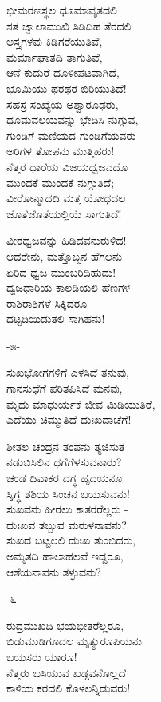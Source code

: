 ಭೀಮರಣಸ್ಥಲ ಧೂಮಾವೃತದಲಿ\\ಶತ ಜ್ವಾಲಾಮುಖಿ ಸಿಡಿದಿಹ ತೆರದಲಿ\\ಅಸ್ತ್ರಗಳವು ಕಿಡಿಗರೆಯುತಿವೆ,\\ಮರ್ಮಾಘಾತದಿ ತಾಗುತಿವೆ,\\ಆನೆ-ಕುದುರೆ ಧೂಳೀಪಟವಾಗಿದೆ,\\ಭೂಮಿಯು ಥರಥರ ಬಿರಿಯುತಿದೆ!\\ಸಹಸ್ರ ಸಂಖ್ಯೆಯ ಅಶ್ವಾರೂಢರು,\\ಧೂಮವಲಯವನ್ನು ಭೇದಿಸಿ ನುಗ್ಗುವ,\\ಗುಂಡಿಗೆ ಮಣಿಯದ ಗುಂಡಿಗೆಯವರು\\ಅರಿಗಳ ತೋಪನು ಮುತ್ತಿಹರು!\\
 ನೆತ್ತರ ಧಾರೆಯ ವಿಜಯಧ್ವಜವದೊ\\ಮುಂದಕೆ ಮುಂದಕೆ ನುಗ್ಗುತಿದೆ;\\ವೀರೋನ್ಮಾದದಿ ಮತ್ತ ಯೋಧದಲ\\ಜೊತೆಜೊತೆಯಲ್ಲಿಯೆ ಸಾಗುತಿದೆ!

ವೀರಧ್ವಜವನ್ನು ಹಿಡಿದವನುರುಳಿದ!\\ಆದರೇನು, ಮತ್ತೊಬ್ಬನ ಹೆಗಲನು\\ಏರಿದ ಧ್ವಜ ಮುಂಬರಿದಿಹುದು!\\ಧ್ವಜಧಾರಿಯ ಕಾಲಡಿಯಲಿ ಹೆಣಗಳ\\ರಾಶಿರಾಶಿಗಳೆ ಸಿಕ್ಕಿದರೂ\\ದಟ್ಟಡಿಯಿಡುತಲಿ ಸಾಗಿಹನು!

\begin{center}
-೫-
\end{center}

ಸುಖಭೋಗಗಳಿಗೆ ಎಳಸಿದೆ ತನುವು,\\ಗಾನಸುಧೆಗೆ ಪರಿತಪಿಸಿದೆ ಮನವು,\\ಮೃದು ಮಾಧುರ್ಯಕೆ ಜೀವ ಮಿಡಿಯುತಿರೆ,\\ಎದೆಯು ಚಿಮ್ಮುತಿದೆ ದುಃಖದಾಚೆಗೆ!

ಶೀತಲ ಚಂದ್ರನ ತಂಪನು ತ್ಯಜಿಸುತ\\ನಡುಬಿಸಿಲಿನ ಧಗೆಗೆಳಸುವನಾರು?\\ಚಂಡ ದಿವಾಕರ ದಗ್ಧ ಹೃದಯನೂ\\ಸ್ನಿಗ್ಧ ಶಶಿಯ ಸಿಂಚನ ಬಯಸುವನು!\\
 ಸುಖವನು ಹೀರಲು ಕಾತರರೆಲ್ಲರು -\\ದುಃಖವ ತಬ್ಬುವ ಮರುಳನಾವನು?\\ಸುಖದ ಬಟ್ಟಲಲಿ ದುಃಖ ತುಂಬಿದರು,\\ಅಮೃತದಿ ಹಾಲಾಹಲವೆ ಇದ್ದರೂ,\\ಆಶೆಯನಾವನು ತಳ್ಳುವನು?

\begin{center}
-೬-
\end{center}

ರುದ್ರಮುಖದಿ ಭಯಭೀತರೆಲ್ಲರೂ,\\ಬಿಡುಮುಡಿಗೂದಲ ಮೃತ್ಯುರೂಪಿಯನು\\ಬಯಸರು ಯಾರೂ!\\ನೆತ್ತರು ಬಸಿಯುವ ಖಡ್ಗವನೊಲ್ಲದೆ\\ಕಾಳಿಯ ಕರದಲಿ ಕೊಳಲನ್ನಿಡುವರು!

